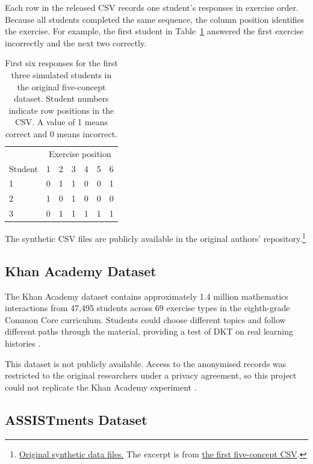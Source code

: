 \documentclass[11pt]{article}
\begin{document}
Each row in the released CSV records one student's responses in
exercise order. Because all students completed the same sequence,
the column position identifies the exercise. For example, the first
student in Table~\ref{tab:original-synthetic-snapshot} answered the
first exercise incorrectly and the next two correctly.

\begin{table}[H]
\centering
\small
\begin{tabular}{@{}lcccccc@{}}
\hline
 & \multicolumn{6}{c}{Exercise position} \\
Student & 1 & 2 & 3 & 4 & 5 & 6 \\
\hline
1 & 0 & 1 & 1 & 0 & 0 & 1 \\
2 & 1 & 0 & 1 & 0 & 0 & 0 \\
3 & 0 & 1 & 1 & 1 & 1 & 1 \\
\hline
\end{tabular}
\caption{First six responses for the first three simulated students
in the original five-concept dataset. Student numbers indicate row
positions in the CSV. A value of 1 means correct and 0 means incorrect.}
\label{tab:original-synthetic-snapshot}
\end{table}

The synthetic CSV files are publicly available
in the original authors' repository.\footnote{\href{https://github.com/chrispiech/DeepKnowledgeTracing/tree/master/data/synthetic}{Original synthetic data files.}
The excerpt is from \href{https://github.com/chrispiech/DeepKnowledgeTracing/blob/master/data/synthetic/naive_c5_q50_s4000_v0.csv}{the first five-concept CSV}.}

\subsection{Khan Academy Dataset}

The Khan Academy dataset contains approximately 1.4 million mathematics
interactions from 47,495 students across 69 exercise types in the
eighth-grade Common Core curriculum. Students could choose different
topics and follow different paths through the material, providing a
test of DKT on real learning histories \citep{piech2015deep}.

This dataset is not publicly available. Access
to the anonymised records was restricted to the original researchers
under a privacy agreement, so this project could not replicate the
Khan Academy experiment \citep{piech2015deep}.

\subsection{ASSISTments Dataset}
\end{document}

